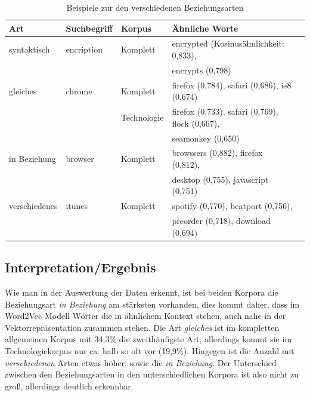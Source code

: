 \documentclass[12pt,a4paper]{report}
\begin{document}
\begin{table}[H]
\caption{Beispiele zur den verschiedenen Beziehungsarten}
\begin{center}
\begin{tabular}{|l||l|l|l|l|}
\hline
Art & Suchbegriff & Korpus & Ähnliche Worte   \\
\hline
\hline
 syntaktisch&encription & Komplett & encrypted (Kosinusähnlichkeit: 0,833),\\
& 	&	& encrypts (0,798)\\
 \hline
 gleiches &chrome	   & Komplett & firefox (0,784), safari (0,686), ie8 (0,674) \\
   &	   & Technologie & firefox (0,733), safari (0,769), flock (0,667),\\
   &&& seamonkey (0,650) \\
\hline
 in Beziehung& browser	 & Komplett & browssers (0,882), firefox (0,812),\\
 &&& desktop (0,755), javascript (0,751)\\
 \hline
verschiedenes& itunes	& Komplett& spotify (0,770), beatport (0,756),\\
&&& preorder (0,718), download (0,694)\\
 	\hline
 
\end{tabular}
\end{center}
\end{table}

		
		
		
		
		
		\subsection{Interpretation/Ergebnis}
		Wie man in der Auswertung der Daten erkennt, ist bei beiden Korpora die Beziehungsart \textit{in Beziehung} am stärksten vorhanden, dies kommt daher, dass im Word2Vec Modell Wörter die in ähnlichem Kontext stehen, auch nahe in der Vektorrepräsentation zusammen stehen. Die Art \textit{gleiches} ist im kompletten allgemeinen Korpus mit 34,3\% die zweithäufigste Art, allerdings kommt sie im Technologiekorpus nur ca. halb so oft vor (19,9\%). Hingegen ist die Anzahl mit \textit{verschiedenen} Arten etwas höher, sowie die \textit{in Beziehung}. Der Unterschied zwischen den Beziehungsarten in den unterschiedlichen Korpora ist also nicht zu groß, allerdings deutlich erkennbar.\\
		
		
		
\end{document}
